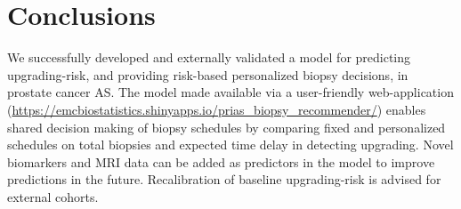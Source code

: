 \section{Conclusions}
We successfully developed and externally validated a model for predicting upgrading-risk, and providing risk-based personalized biopsy decisions, in prostate cancer AS. The model made available via a user-friendly web-application (\url{https://emcbiostatistics.shinyapps.io/prias_biopsy_recommender/}) enables shared decision making of biopsy schedules by comparing fixed and personalized schedules on total biopsies and expected time delay in detecting upgrading. Novel biomarkers and MRI data can be added as predictors in the model to improve predictions in the future. Recalibration of baseline upgrading-risk is advised for external cohorts.